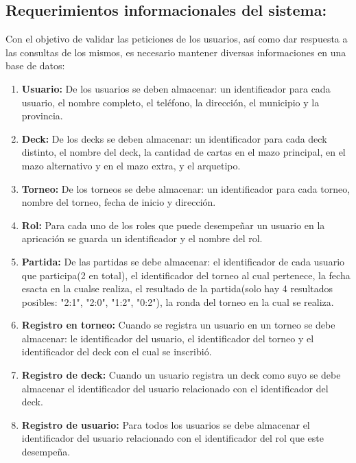 \documentclass[a4paper]{article}
\begin{document}
\subsection{Requerimientos informacionales del sistema:}
Con el objetivo de validar las peticiones de los usuarios, as\'i como dar respuesta a las consultas de los mismos, es necesario mantener diversas informaciones en una base de datos:
\begin{enumerate}
	\item \textbf{Usuario:} De los usuarios se deben almacenar: un identificador para cada usuario, el nombre completo, el tel\'efono, la direcci\'on, el municipio y la provincia.
	\item \textbf{Deck:} De los decks se deben almacenar: un identificador para cada deck distinto, el nombre del deck, la cantidad de cartas en el mazo principal, en el mazo alternativo y en el mazo extra, y el arquetipo.
	\item \textbf{Torneo:} De los torneos se debe almacenar: un identificador para cada torneo, nombre del torneo, fecha de inicio y direcci\'on.
	\item \textbf{Rol:} Para cada uno de los roles que puede desempe\~nar un usuario en la apricaci\'on se guarda un identificador y el nombre del rol.
	\item \textbf{Partida:} De las partidas se debe almacenar: el identificador de cada usuario que participa(2 en total), el identificador del torneo al cual pertenece, la fecha esacta en la cualse realiza, el resultado de la partida(solo hay 4 resultados posibles: "2:1", "2:0", "1:2", "0:2"), la ronda del torneo en la cual se realiza.
	\item \textbf{Registro en torneo:} Cuando se registra un usuario en un torneo se debe almacenar: le identificador del usuario, el identificador del torneo y el identificador del deck con el cual se inscribi\'o.
	\item \textbf{Registro de deck:} Cuando un usuario registra un deck como suyo se debe almacenar el identificador del usuario relacionado con el identificador del deck.
	\item \textbf{Registro de usuario:} Para todos los usuarios se debe almacenar el identificador del usuario relacionado con el identificador del rol que este desempe\~na.
\end{enumerate} 
\end{document}
